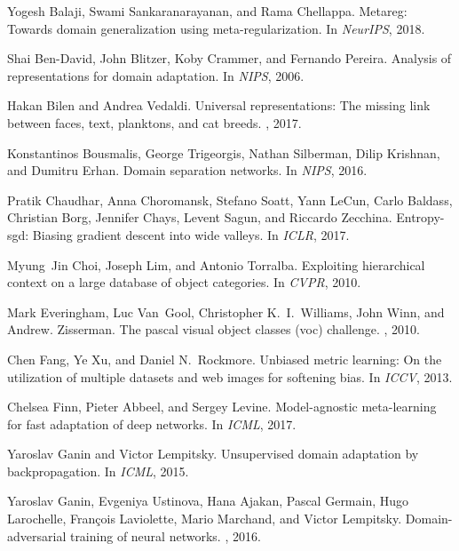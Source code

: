 \documentclass[10pt,twocolumn,letterpaper]{article}
\begin{document}
{\small

\begin{thebibliography}{10}\itemsep=-1pt

Yogesh Balaji, Swami Sankaranarayanan, and Rama Chellappa.
\newblock Metareg: Towards domain generalization using meta-regularization.
\newblock In {\em NeurIPS}, 2018.

Shai Ben-David, John Blitzer, Koby Crammer, and Fernando Pereira.
\newblock Analysis of representations for domain adaptation.
\newblock In {\em NIPS}, 2006.

Hakan Bilen and Andrea Vedaldi.
\newblock Universal representations: The missing link between faces, text,
  planktons, and cat breeds.
, 2017.

Konstantinos Bousmalis, George Trigeorgis, Nathan Silberman, Dilip Krishnan,
  and Dumitru Erhan.
\newblock Domain separation networks.
\newblock In {\em NIPS}, 2016.

Pratik Chaudhar, Anna Choromansk, Stefano Soatt, Yann LeCun, Carlo Baldass,
  Christian Borg, Jennifer Chays, Levent Sagun, and Riccardo Zecchina.
\newblock Entropy-sgd: Biasing gradient descent into wide valleys.
\newblock In {\em ICLR}, 2017.

Myung~Jin Choi, Joseph Lim, and Antonio Torralba.
\newblock Exploiting hierarchical context on a large database of object
  categories.
\newblock In {\em CVPR}, 2010.

Mark Everingham, Luc Van~Gool, Christopher K.~I.~Williams, John Winn, and
  Andrew. Zisserman.
\newblock The pascal visual object classes (voc) challenge.
, 2010.

Chen Fang, Ye Xu, and Daniel N.~Rockmore.
\newblock Unbiased metric learning: On the utilization of multiple datasets and
  web images for softening bias.
\newblock In {\em ICCV}, 2013.

Chelsea Finn, Pieter Abbeel, and Sergey Levine.
\newblock Model-agnostic meta-learning for fast adaptation of deep networks.
\newblock In {\em ICML}, 2017.

Yaroslav Ganin and Victor Lempitsky.
\newblock Unsupervised domain adaptation by backpropagation.
\newblock In {\em ICML}, 2015.

Yaroslav Ganin, Evgeniya Ustinova, Hana Ajakan, Pascal Germain, Hugo
  Larochelle, Fran{\c{c}}ois Laviolette, Mario Marchand, and Victor Lempitsky.
\newblock Domain-adversarial training of neural networks.
, 2016.


\end{thebibliography}}
\end{document}
